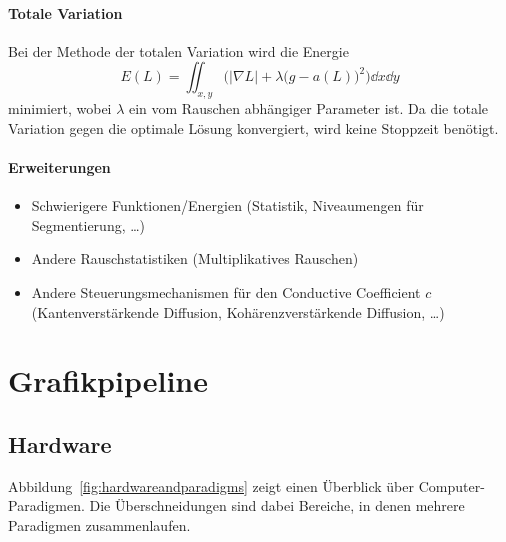 			\subsubsection{Totale Variation}
				Bei der Methode der totalen Variation wird die Energie
				\begin{equation*}
					E(L) = \iint_{x, y} \! \Big( \lvert \nabla L \rvert + \lambda\big( g - a(L) \big)^2 \Big) \dd{x} \dd{y}
				\end{equation*}
				minimiert, wobei \(\lambda\) ein vom Rauschen abhängiger Parameter ist. Da die totale Variation gegen die optimale Lösung konvergiert, wird keine Stoppzeit benötigt.

			\subsubsection{Erweiterungen}
				\begin{itemize}
					\item Schwierigere Funktionen/Energien (Statistik, Niveaumengen für Segmentierung, \dots)
					\item Andere Rauschstatistiken (\zB Multiplikatives Rauschen)
					\item Andere Steuerungsmechanismen für den Conductive Coefficient \(c\) (\zB Kantenverstärkende Diffusion, Kohärenzverstärkende Diffusion, \dots)
				\end{itemize}

\chapter{Grafikpipeline}
	\section{Hardware}
		Abbildung~\ref{fig:hardwareandparadigms} zeigt einen Überblick über Computer-Paradigmen. Die Überschneidungen sind dabei Bereiche, in denen mehrere Paradigmen zusammenlaufen.
	
